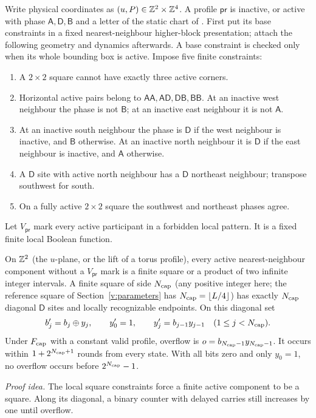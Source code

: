 Write physical coordinates as \((u,P)\in\mathbb Z^2\times\mathbb Z^4\). A profile
\(\mathsf{pr}\) is inactive, or active with phase
\(\mathsf A,\mathsf D,\mathsf B\) and a letter of the static chart of
\cite[Sections~3--4]{DMNoise2026}. First put its base constraints in a
fixed nearest-neighbour higher-block presentation; attach the following
geometry and dynamics afterwards. A base constraint is checked only
when its whole bounding box is active. Impose five finite constraints:
\begin{enumerate}
\item A \(2\times2\) square cannot have exactly three active corners.
\item Horizontal active pairs belong to
\(\mathsf{AA},\mathsf{AD},\mathsf{DB},\mathsf{BB}\). At an inactive west
neighbour the phase is not \(\mathsf B\); at an inactive east neighbour
it is not \(\mathsf A\).
\item At an inactive south neighbour the phase is \(\mathsf D\) if
the west neighbour is inactive, and \(\mathsf B\) otherwise. At an
inactive north neighbour it is \(\mathsf D\) if the east neighbour is
inactive, and \(\mathsf A\) otherwise.
\item A \(\mathsf D\) site with active north neighbour has a
\(\mathsf D\) northeast neighbour; transpose southwest for south.
\item On a fully active \(2\times2\) square the southwest and northeast
phases agree.
\end{enumerate}
Let \(V_{\mathsf{pr}}\) mark every active participant in a forbidden
local pattern. It is a fixed finite local Boolean function.

\begin{lemma}\label{v:cap}
On \(\mathbb Z^2\) (the \(u\)-plane, or the lift of a torus profile), every active
nearest-neighbour component without a \(V_{\mathsf{pr}}\) mark is a finite
square or a product of two infinite integer intervals. A finite square of
side \(N_{\rm cap}\) (any positive integer here; the reference square of
Section~\ref{v:parameters} has \(N_{\rm cap}=\lfloor L/4\rfloor\))
has exactly \(N_{\rm cap}\) diagonal \(\mathsf D\) sites and locally
recognizable endpoints. On this diagonal set
\[
 b'_j=b_j\mathbin\oplus y_j,\qquad y'_0=1,\qquad
 y'_j=b_{j-1}y_{j-1}\quad(1\le j<N_{\rm cap}).
\]
Under \(F_{\rm cap}\) with a constant valid profile, overflow is \(o=b_{N_{\rm cap}-1}y_{N_{\rm cap}-1}\). It occurs within
\(1+2^{N_{\rm cap}+1}\) rounds from every state. With all bits zero and
only \(y_0=1\), no overflow occurs before \(2^{N_{\rm cap}}-1\).
\end{lemma}
\par\noindent\emph{Proof idea.} The local square constraints force a finite active component to be a square. Along its diagonal, a binary counter with delayed carries still increases by one until overflow.

